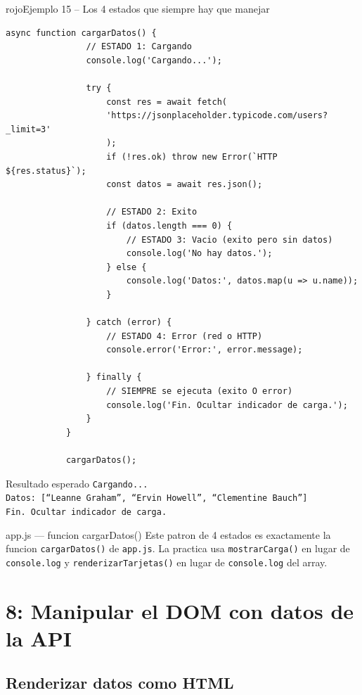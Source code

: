 \documentclass[11pt,a4paper]{article}
\begin{document}
	\begin{cajacodigo}{rojo}{Ejemplo 15 -- Los 4 estados que siempre hay que manejar}
		\begin{lstlisting}[style=codejs]
			async function cargarDatos() {
				// ESTADO 1: Cargando
				console.log('Cargando...');
				
				try {
					const res = await fetch(
					'https://jsonplaceholder.typicode.com/users?_limit=3'
					);
					if (!res.ok) throw new Error(`HTTP ${res.status}`);
					const datos = await res.json();
					
					// ESTADO 2: Exito
					if (datos.length === 0) {
						// ESTADO 3: Vacio (exito pero sin datos)
						console.log('No hay datos.');
					} else {
						console.log('Datos:', datos.map(u => u.name));
					}
					
				} catch (error) {
					// ESTADO 4: Error (red o HTTP)
					console.error('Error:', error.message);
					
				} finally {
					// SIEMPRE se ejecuta (exito O error)
					console.log('Fin. Ocultar indicador de carga.');
				}
			}
			
			cargarDatos();
		\end{lstlisting}
	\end{cajacodigo}
	
	\begin{cajaresultado}{Resultado esperado}
		\texttt{Cargando...}\\
		\texttt{Datos: [``Leanne Graham'', ``Ervin Howell'', ``Clementine Bauch'']}\\
		\texttt{Fin. Ocultar indicador de carga.}
	\end{cajaresultado}
	
	\begin{cajapractica}{app.js --- funcion cargarDatos()}
		Este patron de 4 estados es exactamente la funcion \texttt{cargarDatos()} de \texttt{app.js}. La practica usa \texttt{mostrarCarga()} en lugar de \texttt{console.log} y \texttt{renderizarTarjetas()} en lugar de \texttt{console.log} del array.
	\end{cajapractica}
	
	\section{8: Manipular el DOM con datos de la API}
	
	\subsection{Renderizar datos como HTML}
	
\end{document}
